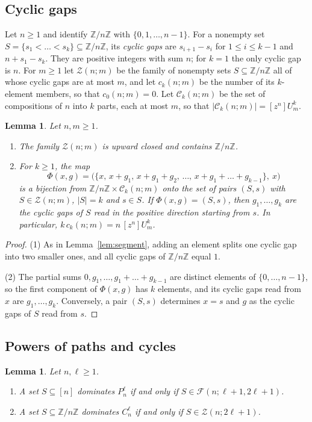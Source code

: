 \documentclass{amsart}
\newtheorem{lemma}[theorem]{Lemma}
\theoremstyle{definition}
\theoremstyle{remark}
\numberwithin{equation}{section}
\newcommand{\cF}{\mathcal{F}}
\newcommand{\cC}{\mathcal{C}}
\newcommand{\Cyc}{\mathcal{Z}}
\newcommand{\Z}{\mathbb{Z}}
\newcommand{\coef}[1]{[z^{#1}]}
\begin{document}
\subsection{Cyclic gaps}
Let $n\ge1$ and identify $\Z/n\Z$ with $\{0,1,\dots,n-1\}$. For a nonempty set $S=\{s_1<\dots<s_k\}\subseteq\Z/n\Z$, its \emph{cyclic gaps} are $s_{i+1}-s_i$ for $1\le i\le k-1$ and $n+s_1-s_k$. They are positive integers with sum $n$; for $k=1$ the only cyclic gap is $n$. For $m\ge1$ let $\Cyc(n;m)$ be the family of nonempty sets $S\subseteq\Z/n\Z$ all of whose cyclic gaps are at most $m$, and let $c_k(n;m)$ be the number of its $k$-element members, so that $c_0(n;m)=0$. Let $\cC_k(n;m)$ be the set of compositions of $n$ into $k$ parts, each at most $m$, so that $|\cC_k(n;m)|=\coef{n}U_m^k$.

\begin{lemma}\label{lem:cyclic}
Let $n,m\ge1$.
\begin{enumerate}
\item The family $\Cyc(n;m)$ is upward closed and contains $\Z/n\Z$.
\item For $k\ge1$, the map
\[
\Phi(x,g)=\bigl(\{x,\,x+g_1,\,x+g_1+g_2,\,\dots,\,x+g_1+\dots+g_{k-1}\},\ x\bigr)
\]
is a bijection from $\Z/n\Z\times\cC_k(n;m)$ onto the set of pairs $(S,s)$ with $S\in\Cyc(n;m)$, $|S|=k$ and $s\in S$. If $\Phi(x,g)=(S,s)$, then $g_1,\dots,g_k$ are the cyclic gaps of $S$ read in the positive direction starting from $s$. In particular, $k\,c_k(n;m)=n\,\coef{n}U_m^k$.
\end{enumerate}
\end{lemma}

\begin{proof}
(1) As in Lemma~\ref{lem:segment}, adding an element splits one cyclic gap into two smaller ones, and all cyclic gaps of $\Z/n\Z$ equal $1$.

(2) The partial sums $0,g_1,\dots,g_1+\dots+g_{k-1}$ are distinct elements of $\{0,\dots,n-1\}$, so the first component of $\Phi(x,g)$ has $k$ elements, and its cyclic gaps read from $x$ are $g_1,\dots,g_k$. Conversely, a pair $(S,s)$ determines $x=s$ and $g$ as the cyclic gaps of $S$ read from $s$.
\end{proof}

\subsection{Powers of paths and cycles}

\begin{lemma}\label{lem:graphs}
Let $n,\ell\ge1$.
\begin{enumerate}
\item A set $S\subseteq[n]$ dominates $P_n^\ell$ if and only if $S\in\cF(n;\ell+1,2\ell+1)$.
\item A set $S\subseteq\Z/n\Z$ dominates $C_n^\ell$ if and only if $S\in\Cyc(n;2\ell+1)$.
\end{enumerate}
\end{lemma}
\end{document}
